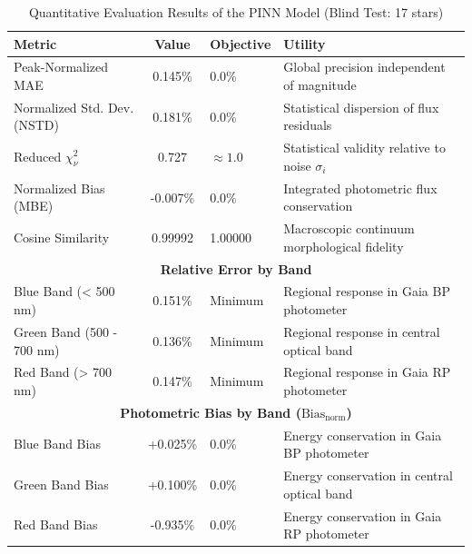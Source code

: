 
\begin{table}[htpb]
\centering
\caption{Quantitative Evaluation Results of the PINN Model (Blind Test: 17 stars)}
\label{tab:pinn_evaluation}
\begin{tabular}{lcll}
\hline
\textbf{Metric} & \textbf{Value} & \textbf{Objective} & \textbf{Utility} \\
\hline
Peak-Normalized MAE & 0.145\% & 0.0\% & Global precision independent of magnitude \\
Normalized Std. Dev. (NSTD) & 0.181\% & 0.0\% & Statistical dispersion of flux residuals \\
Reduced $\chi^2_\nu$ & 0.727 & $\approx 1.0$ & Statistical validity relative to noise $\sigma_i$ \\
Normalized Bias (MBE) & -0.007\% & 0.0\% & Integrated photometric flux conservation \\
Cosine Similarity & 0.99992 & 1.00000 & Macroscopic continuum morphological fidelity \\
\hline
\multicolumn{4}{c}{\textbf{Relative Error by Band}} \\
\hline
Blue Band (< 500 nm) & 0.151\% & Minimum & Regional response in Gaia BP photometer \\
Green Band (500 - 700 nm) & 0.136\% & Minimum & Regional response in central optical band \\
Red Band (> 700 nm) & 0.147\% & Minimum & Regional response in Gaia RP photometer \\
\hline
\multicolumn{4}{c}{\textbf{Photometric Bias by Band ($\text{Bias}_{\text{norm}}$)}} \\
\hline
Blue Band Bias & +0.025\% & 0.0\% & Energy conservation in Gaia BP photometer \\
Green Band Bias & +0.100\% & 0.0\% & Energy conservation in central optical band \\
Red Band Bias & -0.935\% & 0.0\% & Energy conservation in Gaia RP photometer \\
\hline
\end{tabular}
\end{table}

